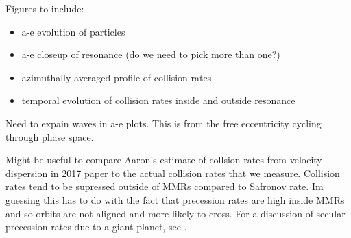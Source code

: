 \documentclass[twocolumn]{aastex63}
\begin{document}





Figures to include:

\begin{itemize}
    \item a-e evolution of particles
    \item a-e closeup of resonance (do we need to pick more than one?)
    \item azimuthally averaged profile of collision rates
    \item temporal evolution of collision rates inside and outside resonance
\end{itemize}

Need to expain waves in a-e plots. This is from the free eccentricity cycling through phase space.

Might be useful to compare Aaron's estimate of collsion rates from velocity dispersion in 2017 paper to the actual collision rates that we measure. Collision rates tend to be supressed outside of MMRs compared to Safronov rate. Im guessing this has to do with the fact that precession rates are high inside MMRs and so orbits are not aligned and more likely to cross. For a discussion of secular precession rates due to a giant planet, see \citet{2009MNRAS.399.1403M}.



\clearpage
\end{document}

